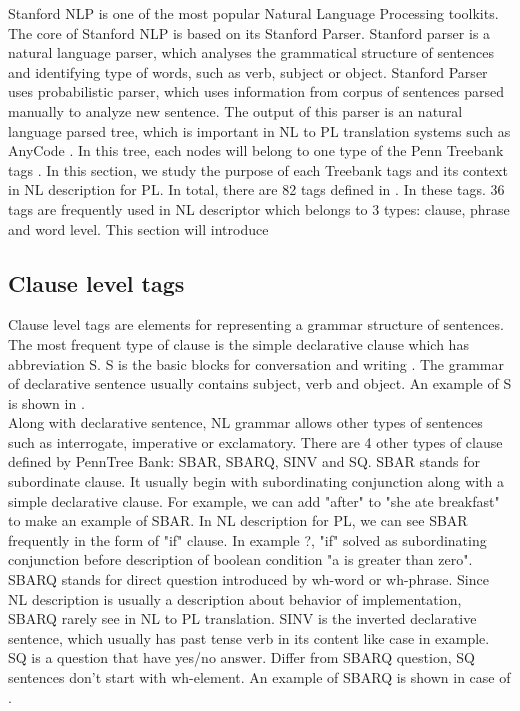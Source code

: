 Stanford NLP \cite{} is one of the most popular Natural Language Processing toolkits. The core of Stanford NLP is based on its Stanford Parser. Stanford parser is a natural language parser, which analyses the grammatical structure of sentences and identifying type of words, such as verb, subject or object. Stanford Parser uses probabilistic parser, which uses information from corpus of sentences parsed manually to analyze new sentence. The output of this parser is an natural language parsed tree, which is important in NL to PL translation systems such as AnyCode \cite{}. In this tree, each nodes will belong to one type of the Penn Treebank tags \cite{}. In this section, we study the purpose of each Treebank tags and its context in NL description for PL. In total, there are 82 tags defined in \cite{}. In these tags. 36 tags are frequently used in  NL descriptor which belongs to 3 types: clause, phrase and word level. This section will introduce 

\subsection{Clause level tags}
Clause level tags are elements for representing a grammar structure of sentences. The most frequent type of clause is the simple declarative clause which has abbreviation S. S is the basic blocks for conversation and writing \cite{}. The grammar of declarative sentence usually contains subject, verb and object. An example of S is shown in \cite{}. \\
Along with declarative sentence, NL grammar allows other types of sentences such as interrogate, imperative or exclamatory. There are 4 other types of clause defined by PennTree Bank: SBAR, SBARQ, SINV and SQ. SBAR stands for subordinate clause. It usually begin with subordinating conjunction along with a simple declarative clause. For example, we can add "after" to "she ate breakfast" to make an example of SBAR. In NL description for PL, we can see SBAR frequently in the form of "if" clause. In example ?, "if" solved as subordinating conjunction before description of boolean condition "a is greater than zero". SBARQ stands for direct question introduced by wh-word or wh-phrase. Since NL description is usually a description about behavior of implementation, SBARQ rarely see in NL to PL translation. SINV is the inverted declarative sentence, which usually has past tense verb in its content like case in example. SQ is a question that have yes/no answer. Differ from SBARQ question, SQ sentences don't start with wh-element. An example of SBARQ is shown in case of \cite{}. 
